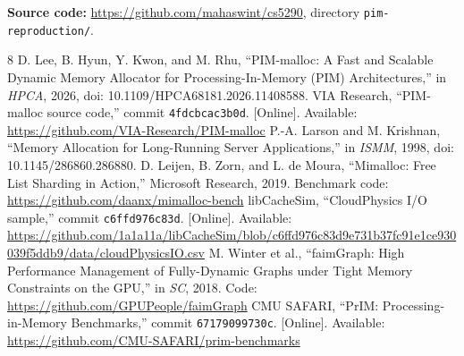 \documentclass[conference]{IEEEtran}
\begin{document}
\noindent\textbf{Source code:} \url{https://github.com/mahaswint/cs5290}, directory \texttt{pim-reproduction/}.

\begin{thebibliography}{8}
 D. Lee, B. Hyun, Y. Kwon, and M. Rhu, ``PIM-malloc: A Fast and Scalable Dynamic Memory Allocator for Processing-In-Memory (PIM) Architectures,'' in \emph{HPCA}, 2026, doi: 10.1109/HPCA68181.2026.11408588.
 VIA Research, ``PIM-malloc source code,'' commit \texttt{4fdcbcac3b0d}. [Online]. Available: \url{https://github.com/VIA-Research/PIM-malloc}
 P.-A. Larson and M. Krishnan, ``Memory Allocation for Long-Running Server Applications,'' in \emph{ISMM}, 1998, doi: 10.1145/286860.286880.
 D. Leijen, B. Zorn, and L. de Moura, ``Mimalloc: Free List Sharding in Action,'' Microsoft Research, 2019. Benchmark code: \url{https://github.com/daanx/mimalloc-bench}
 libCacheSim, ``CloudPhysics I/O sample,'' commit \texttt{c6ffd976c83d}. [Online]. Available: \url{https://github.com/1a1a11a/libCacheSim/blob/c6ffd976c83d9e731b37fc91e1ce930039f5ddb9/data/cloudPhysicsIO.csv}
 M. Winter et al., ``faimGraph: High Performance Management of Fully-Dynamic Graphs under Tight Memory Constraints on the GPU,'' in \emph{SC}, 2018. Code: \url{https://github.com/GPUPeople/faimGraph}
 CMU SAFARI, ``PrIM: Processing-in-Memory Benchmarks,'' commit \texttt{67179099730c}. [Online]. Available: \url{https://github.com/CMU-SAFARI/prim-benchmarks}
\end{thebibliography}
\end{document}
